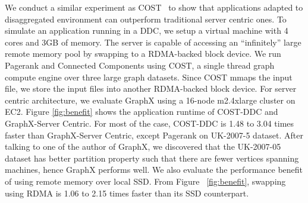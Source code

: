 We conduct a similar experiment as COST~\cite{cost} to show that applications adapted to disaggregated environment can outperform traditional server centric ones.
To simulate an application running in a DDC, we setup a virtual machine with 4 cores and 3GB of memory. 
The server is capable of accessing an ``infinitely'' large remote memory pool by swapping to a RDMA-backed block device. 
We run Pagerank and Connected Components using COST, a single thread graph compute engine over three large graph datasets.
Since COST mmaps the input file, we store the input files into another RDMA-backed block device.
For server centric architecture, we evaluate GraphX using a 16-node m2.4xlarge cluster on EC2. 
Figure \ref{fig:benefit} shows the application runtime of COST-DDC and GraphX-Server Centric.
For most of the case, COST-DDC is 1.48 to 3.04 times faster than GraphX-Server Centric, except Pagerank on UK-2007-5 dataset. 
After talking to one of the author of GraphX, we discovered that the UK-2007-05 dataset has better partition property such that there are fewer vertices spanning machines, hence GraphX performs well. 
We also evaluate the performance benefit of using remote memory over local SSD.
From Figure ~\ref{fig:benefit}, swapping using RDMA is 1.06 to 2.15 times faster than its SSD counterpart. 













